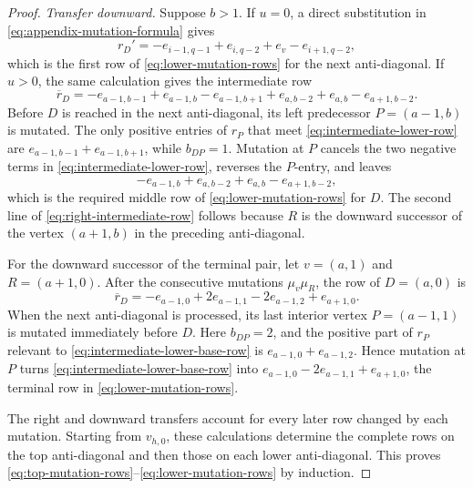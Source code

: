 \documentclass[11pt]{amsart}
\theoremstyle{definition}
\theoremstyle{remark}
\begin{document}
\begin{proof}
\smallskip
\noindent\emph{Transfer downward.}
Suppose $b>1$.  If $u=0$, a direct substitution in
\eqref{eq:appendix-mutation-formula} gives
\[ r_D'=-e_{i-1,q-1}+e_{i,q-2}+e_v-e_{i+1,q-2}, \]
which is the first row of \eqref{eq:lower-mutation-rows} for the next
anti-diagonal.  If $u>0$, the same calculation gives the intermediate row
\begin{equation}
 \overline r_D=
 -e_{a-1,b-1}+e_{a-1,b}-e_{a-1,b+1}
 +e_{a,b-2}+e_{a,b}-e_{a+1,b-2}.
 \label{eq:intermediate-lower-row}
\end{equation}
Before $D$ is reached in the next anti-diagonal, its left predecessor
$P=(a-1,b)$ is mutated.  The only positive entries of $r_P$ that meet
\eqref{eq:intermediate-lower-row} are
$e_{a-1,b-1}+e_{a-1,b+1}$, while
$b_{DP}=1$.  Mutation at $P$ cancels the two negative terms in
\eqref{eq:intermediate-lower-row}, reverses the $P$-entry, and leaves
\[ -e_{a-1,b}+e_{a,b-2}+e_{a,b}-e_{a+1,b-2}, \]
which is the required middle row of \eqref{eq:lower-mutation-rows} for $D$.
The second line of \eqref{eq:right-intermediate-row} follows because
$R$ is the downward successor of the vertex $(a+1,b)$ in the preceding
anti-diagonal.

For the downward successor of the terminal pair, let
$v=(a,1)$ and $R=(a+1,0)$.  After the consecutive mutations
$\mu_v\mu_R$, the row of $D=(a,0)$ is
\begin{equation}
 \overline r_D=
 -e_{a-1,0}+2e_{a-1,1}-2e_{a-1,2}+e_{a+1,0}.
 \label{eq:intermediate-lower-base-row}
\end{equation}
When the next anti-diagonal is processed, its last interior vertex
$P=(a-1,1)$ is mutated immediately before $D$.  Here $b_{DP}=2$, and the
positive part of $r_P$ relevant to
\eqref{eq:intermediate-lower-base-row} is
$e_{a-1,0}+e_{a-1,2}$.  Hence mutation at $P$ turns
\eqref{eq:intermediate-lower-base-row} into
$e_{a-1,0}-2e_{a-1,1}+e_{a+1,0}$,
the terminal row in \eqref{eq:lower-mutation-rows}.

The right and downward transfers account for every later row changed by
each mutation.  Starting from $v_{h,0}$, these calculations determine the
complete rows on the top anti-diagonal and then those on each lower
anti-diagonal.  This proves
\eqref{eq:top-mutation-rows}--\eqref{eq:lower-mutation-rows} by induction.
\end{proof}
\end{document}
